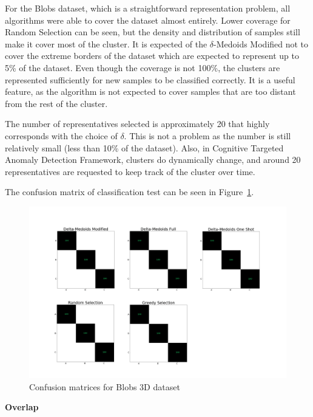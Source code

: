 \documentclass[thesis=B,english]{FITthesis}[2012/10/20]
\begin{document}
\noindent For the Blobs dataset, which is a straightforward representation problem, all algorithms were able to cover the dataset almost entirely.
Lower coverage for Random Selection can be seen, but the density and distribution of samples still make it cover most of the cluster.
It is expected of the $\delta$-Medoids Modified not to cover the extreme borders of the dataset which are expected to represent up to 5\% of the dataset.
Even though the coverage is not 100\%, the clusters are represented sufficiently for new samples to be classified correctly.
It is a useful feature, as the algorithm is not expected to cover samples that are too distant from the rest of the cluster.

The number of representatives selected is approximately 20 that highly corresponds with the choice of $\delta$.
This is not a problem as the number is still relatively small (less than 10\% of the dataset).
Also, in Cognitive Targeted Anomaly Detection Framework, clusters do dynamically change, and around 20 representatives are requested to keep track of the cluster over time.

The confusion matrix of classification test can be seen in Figure~\ref{img:exp1_blobs}.

\begin{figure}[H]
   \includegraphics[width=\linewidth]{img/exp1_blobs.png}
  \caption{Confusion matrices for Blobs 3D dataset}
  \label{img:exp1_blobs}
\end{figure}
\medskip

\noindent \textbf{Overlap}
\end{document}
